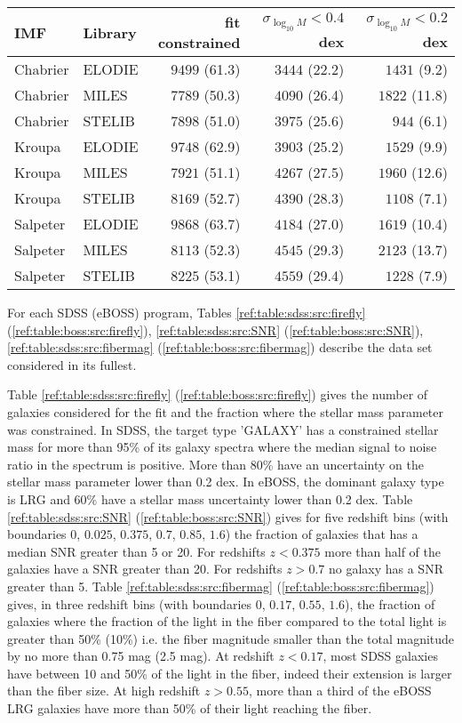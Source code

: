 \documentclass[onecolumn]{aa}
\begin{document}
\begin{table*}
\begin{center}
\begin{tabular}{ll rrr}
IMF &
Library & 
fit constrained & 
$\sigma_{\log_{10}M}<0.4$ dex & 
$\sigma_{\log_{10}M}<0.2$ dex \\ \hline
Chabrier & ELODIE & $9499$ (61.3) & $3444$ (22.2) & $1431$ (9.2) \\ 
Chabrier & MILES & $7789$ (50.3) & $4090$ (26.4) & $1822$ (11.8) \\ 
Chabrier & STELIB & $7898$ (51.0) & $3975$ (25.6) & $944$ (6.1) \\ 
Kroupa & ELODIE & $9748$ (62.9) & $3903$ (25.2) & $1529$ (9.9) \\ 
Kroupa & MILES & $7921$ (51.1) & $4267$ (27.5) & $1960$ (12.6) \\ 
Kroupa & STELIB & $8169$ (52.7) & $4390$ (28.3) & $1108$ (7.1) \\ 
Salpeter & ELODIE & $9868$ (63.7) & $4184$ (27.0) & $1619$ (10.4) \\ 
Salpeter & MILES & $8113$ (52.3) & $4545$ (29.3) & $2123$ (13.7) \\ 
Salpeter & STELIB & $8225$ (53.1) & $4559$ (29.4) & $1228$ (7.9) \\ 

\hline
\end{tabular}
\end{center}
\end{table*}


For each SDSS (eBOSS) program, Tables 
\ref{ref:table:sdss:src:firefly}
(\ref{ref:table:boss:src:firefly}), 
\ref{ref:table:sdss:src:SNR} 
(\ref{ref:table:boss:src:SNR}), 
\ref{ref:table:sdss:src:fibermag} 
(\ref{ref:table:boss:src:fibermag}) 
describe the data set considered in its fullest. 

Table 
\ref{ref:table:sdss:src:firefly} (\ref{ref:table:boss:src:firefly})
gives the number of galaxies considered for the fit and the fraction where the stellar mass parameter was constrained. 
In SDSS, the target type 'GALAXY' has a constrained stellar mass for more than 95\% of its galaxy spectra where the median signal to noise ratio in the spectrum is positive. 
More than 80\% have an uncertainty on the stellar mass parameter lower than 0.2 dex. 
In eBOSS, the dominant galaxy type is LRG and 60\% have a stellar mass uncertainty lower than 0.2 dex. 
Table 
\ref{ref:table:sdss:src:SNR} (\ref{ref:table:boss:src:SNR}) 
gives for five redshift bins (with boundaries $0$, $0.025$, $0.375$, $0.7$, $0.85$, $1.6$) the fraction of galaxies that has a median SNR greater than 5 or 20. For redshifts $z<0.375$ more than half of the galaxies have a SNR greater than 20. For redshifts $z>0.7$ no galaxy has a SNR greater than 5. 
Table 
\ref{ref:table:sdss:src:fibermag} (\ref{ref:table:boss:src:fibermag}) 
gives, in three redshift bins (with boundaries $0$, $0.17$,  $0.55$, $1.6$), the fraction of galaxies where the fraction of the light in the fiber compared to the total light is greater than 50\% (10\%) i.e. the fiber magnitude smaller than the total magnitude by no more than 0.75 mag (2.5 mag). 
At redshift $z<0.17$, most SDSS galaxies have between 10 and 50\% of the light in the fiber, indeed their extension is larger than the fiber size.  
At high redshift $z>0.55$, more than a third of the eBOSS LRG galaxies have more than 50\% of their light reaching the fiber.
\end{document}
